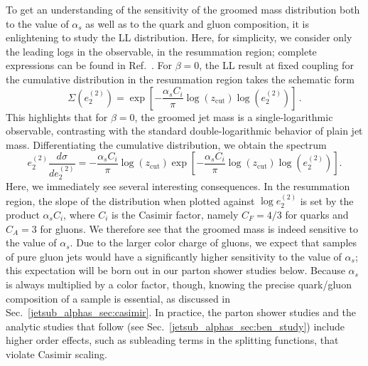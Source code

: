 \documentclass[11pt]{cernrep}
\begin{document}
To get an understanding of the sensitivity of the groomed mass distribution both to the value of $\alpha_s$ as well as to the quark and gluon composition, it is enlightening to study the LL distribution.
%
Here, for simplicity, we consider only the leading logs in the observable, in the resummation region; complete expressions can be found in Ref.~\cite{Larkoski:2014wba,Frye:2016aiz,Marzani:2017kqd,Marzani:2017mva}.
%
For $\beta=0$, the LL result at fixed coupling for the cumulative distribution in the resummation region takes the schematic form
%
\begin{equation}
\Sigma(e_2^{(2)})=\exp\left[ - \frac{\alpha_s C_i}{\pi} \log(z_{\mathrm{cut}} ) \log (e_2^{(2)}) \right]\,.
\end{equation}
%
This highlights that for $\beta=0$, the groomed jet mass is a single-logarithmic observable, contrasting with the standard double-logarithmic behavior of plain jet mass.
%
Differentiating the cumulative distribution, we obtain the spectrum
%
\begin{equation}
\label{jetsub_alphas_eq:ecf_ll_dsitribution}
e_2^{(2)} \frac{d\sigma}{d e_2^{(2)}}=   - \frac{\alpha_s C_i}{\pi} \log(z_{\mathrm{cut}} )   \exp\left[ - \frac{\alpha_s C_i}{\pi}  \log(z_{\mathrm{cut}} ) \log (e_2^{(2)}) \right].
\end{equation}
%
Here, we immediately see several interesting consequences.
%
In the resummation region, the slope of the distribution when plotted against $\log e_2^{(2)}$ is set by the product $\alpha_s C_i$, where $C_i$ is the Casimir factor, namely $C_F = 4/3$ for quarks and $C_A = 3$ for gluons.
%
We therefore see that the groomed mass is indeed sensitive to the value of $\alpha_s$.
%
Due to the larger color charge of gluons, we expect that samples of pure gluon jets would have a significantly higher sensitivity to the value of $\alpha_s$; this expectation will be born out in our parton shower studies below.
%
Because $\alpha_s$ is always multiplied by a color factor, though, knowing the precise quark/gluon composition of a sample is essential, as discussed in Sec.~\ref{jetsub_alphas_sec:casimir}.
%
In practice, the parton shower studies and the analytic studies that follow (see Sec.~\ref{jetsub_alphas_sec:ben_study}) include higher order effects, such as subleading terms in the splitting functions, that violate Casimir scaling.

\end{document}
